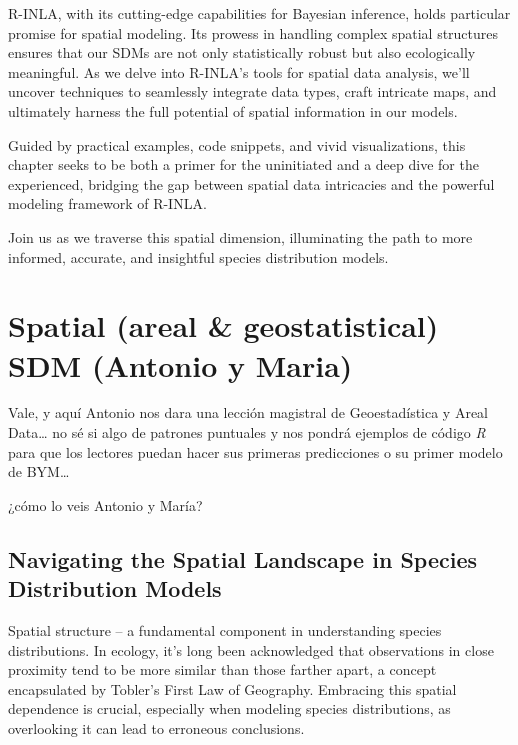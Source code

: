 \documentclass[
]{krantz}
\newcommand{\R}{\textsl{R }}
\begin{document}
R-INLA, with its cutting-edge capabilities for Bayesian inference, holds particular promise for spatial modeling. Its prowess in handling complex spatial structures ensures that our SDMs are not only statistically robust but also ecologically meaningful. As we delve into R-INLA's tools for spatial data analysis, we'll uncover techniques to seamlessly integrate data types, craft intricate maps, and ultimately harness the full potential of spatial information in our models.

Guided by practical examples, code snippets, and vivid visualizations, this chapter seeks to be both a primer for the uninitiated and a deep dive for the experienced, bridging the gap between spatial data intricacies and the powerful modeling framework of R-INLA.

Join us as we traverse this spatial dimension, illuminating the path to more informed, accurate, and insightful species distribution models.

\pagebreak 
\setcounter{chapter}{5}
\setcounter{section}{0}
\renewcommand{\thepage}{\arabic{page}}

\hypertarget{spatial-areal-geostatistical-sdm-antonio-y-maria}{%
\chapter{Spatial (areal \& geostatistical) SDM (Antonio y Maria)}\label{spatial-areal-geostatistical-sdm-antonio-y-maria}}

Vale, y aquí Antonio nos dara una lección magistral de Geoestadística y Areal Data\ldots{} no sé si algo de patrones puntuales y nos pondrá ejemplos de código \R para que los lectores puedan hacer sus primeras predicciones o su primer modelo de BYM\ldots{}

¿cómo lo veis Antonio y María?

\hypertarget{navigating-the-spatial-landscape-in-species-distribution-models}{%
\section{Navigating the Spatial Landscape in Species Distribution Models}\label{navigating-the-spatial-landscape-in-species-distribution-models}}

Spatial structure -- a fundamental component in understanding species distributions. In ecology, it's long been acknowledged that observations in close proximity tend to be more similar than those farther apart, a concept encapsulated by Tobler's First Law of Geography. Embracing this spatial dependence is crucial, especially when modeling species distributions, as overlooking it can lead to erroneous conclusions.
\end{document}
